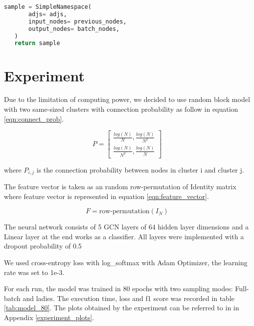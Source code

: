 \begin{lstlisting}[language=Python, caption= LADIES code, label=ls:ladies_code]
   sample = SimpleNamespace(
       adjs= adjs,
       input_nodes= previous_nodes,
       output_nodes= batch_nodes,
   )
   return sample

\end{lstlisting}

\section{Experiment}
Due to the limitation of computing power, we decided to use random block model with two same-sized clusters with connection probability as follow in equation \ref{eqn:connect_prob}.

\begin{equation}
    P = \begin{bmatrix}
    \frac{log(N)}{N}, \frac{log(N)}{N^2}\\
    \frac{log(N)}{N^2}, \frac{log(N)}{N}
    \end{bmatrix}
    \label{eqn:connect_prob}
\end{equation}

where $P_{i, j}$ is the connection probability between nodes in cluster i and cluster j.

The feature vector is taken as an random row-permutation of Identity matrix where feature vector is represented in equation \ref{eqn:feature_vector}.

\begin{equation}
    F = \text{row-permutation}(I_N)
    \label{eqn:feature_vector}
\end{equation}

The neural network consists of 5 GCN layers of 64 hidden layer dimensions and a Linear layer at the end works as a classifier. All layers were implemented with a dropout probability of 0.5

We used cross-entropy loss with log\_softmax with Adam Optimizer, the learning rate was set to 1e-3.

For each run, the model was trained in 80 epochs with two sampling modes: Full-batch and ladies.
The execution time, loss and f1 score was recorded in table \ref{tab:model_80}. The plots obtained by the experiment can be referred to in in Appendix \ref{experiment_plots}.

